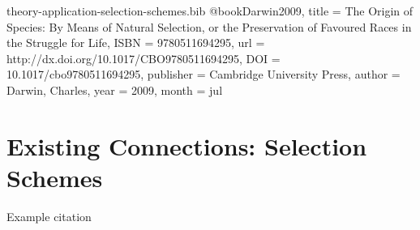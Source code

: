 \begin{bibunit}

\begin{filecontents*}[overwrite]{theory-application-selection-schemes.bib}
@book{Darwin2009,
  title = {The Origin of Species: By Means of Natural Selection,  or the Preservation of Favoured Races in the Struggle for Life},
  ISBN = {9780511694295},
  url = {http://dx.doi.org/10.1017/CBO9780511694295},
  DOI = {10.1017/cbo9780511694295},
  publisher = {Cambridge University Press},
  author = {Darwin,  Charles},
  year = {2009},
  month = jul 
}
\end{filecontents*} 

\section{Existing Connections: Selection Schemes}
\label{sec:diversity-maintenance}

Example citation \citep{Darwin2009}

    
\end{bibunit}
